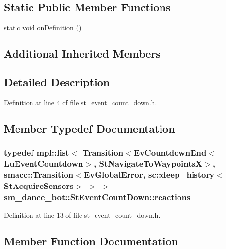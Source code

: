 \subsection*{Static Public Member Functions}
\begin{DoxyCompactItemize}
\item 
static void \hyperlink{structsm__dance__bot_1_1StEventCountDown_a93bb32fa9321d2babd851833eac44a6f}{on\+Definition} ()
\end{DoxyCompactItemize}
\subsection*{Additional Inherited Members}


\subsection{Detailed Description}


Definition at line 4 of file st\+\_\+event\+\_\+count\+\_\+down.\+h.



\subsection{Member Typedef Documentation}
\subsubsection[{\texorpdfstring{reactions}{reactions}}]{\setlength{\rightskip}{0pt plus 5cm}typedef mpl\+::list$<$ Transition$<$Ev\+Countdown\+End$<$Lu\+Event\+Countdown$>$, {\bf St\+Navigate\+To\+WaypointsX}$>$, {\bf smacc\+::\+Transition}$<${\bf Ev\+Global\+Error}, sc\+::deep\+\_\+history$<${\bf St\+Acquire\+Sensors}$>$ $>$ $>$ {\bf sm\+\_\+dance\+\_\+bot\+::\+St\+Event\+Count\+Down\+::reactions}}\hypertarget{structsm__dance__bot_1_1StEventCountDown_a8197124719da64c2cb881fd063c1bac2}{}\label{structsm__dance__bot_1_1StEventCountDown_a8197124719da64c2cb881fd063c1bac2}


Definition at line 13 of file st\+\_\+event\+\_\+count\+\_\+down.\+h.



\subsection{Member Function Documentation}
